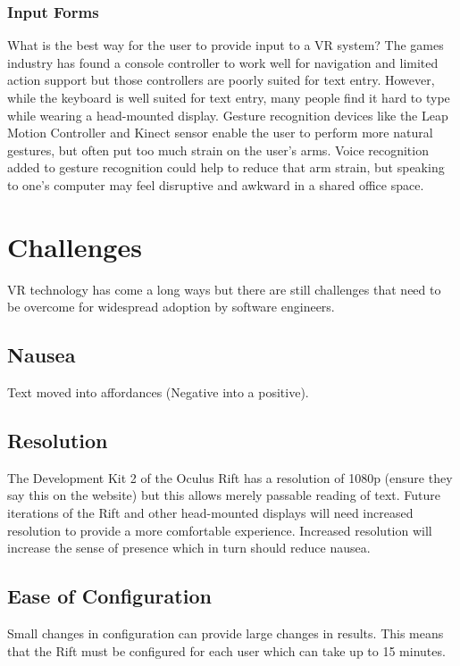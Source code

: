 \documentclass[conference]{IEEEtran}
\begin{document}
\subsubsection{Input Forms}
What is the best way for the user to provide input to a VR system? 
The games industry has found a console controller to work well for navigation and limited action support but those controllers are poorly suited for text entry. 
However, while the keyboard is well suited for text entry, many people find it hard to type while wearing a head-mounted display. 
Gesture recognition devices like the Leap Motion Controller and Kinect sensor enable the user to perform more natural gestures, but often put too much strain on the user's arms. 
Voice recognition added to gesture recognition could help to reduce that arm strain, but speaking to one's computer may feel disruptive and awkward in a shared office space.

\section{Challenges}
VR technology has come a long ways but there are still challenges that need to be overcome for widespread adoption by software engineers.

\subsection{Nausea}
Text moved into affordances (Negative into a positive).

\subsection{Resolution}
The Development Kit 2 of the Oculus Rift has a resolution of 1080p (ensure they say this on the website) but this allows merely passable reading of text. 
Future iterations of the Rift and other head-mounted displays will need increased resolution to provide a more comfortable experience.
Increased resolution will increase the sense of presence which in turn should reduce nausea.

\subsection{Ease of Configuration}
Small changes in configuration can provide large changes in results.
This means that the Rift must be configured for each user which can take up to 15 minutes.
\end{document}
